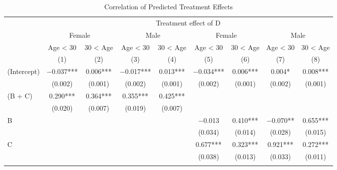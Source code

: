 \documentclass[
  11pt,
  a4paper
]{article}
\begin{document}
\begin{table}

\caption{\label{tab:rcf-int-corr}Correlation of Predicted Treatment Effects}
\centering
\fontsize{9}{11}\selectfont
\begin{threeparttable}
\begin{tabular}[t]{lcccccccc}
\toprule
\multicolumn{1}{c}{ } & \multicolumn{8}{c}{Treatment effect of D} \\
\cmidrule(l{3pt}r{3pt}){2-9}
\multicolumn{1}{c}{ } & \multicolumn{2}{c}{Female} & \multicolumn{2}{c}{Male} & \multicolumn{2}{c}{Female} & \multicolumn{2}{c}{Male} \\
\cmidrule(l{3pt}r{3pt}){2-3} \cmidrule(l{3pt}r{3pt}){4-5} \cmidrule(l{3pt}r{3pt}){6-7} \cmidrule(l{3pt}r{3pt}){8-9}
\multicolumn{1}{c}{ } & \multicolumn{1}{c}{Age < 30} & \multicolumn{1}{c}{30 < Age} & \multicolumn{1}{c}{Age < 30} & \multicolumn{1}{c}{30 < Age} & \multicolumn{1}{c}{Age < 30} & \multicolumn{1}{c}{30 < Age} & \multicolumn{1}{c}{Age < 30} & \multicolumn{1}{c}{30 < Age} \\
\cmidrule(l{3pt}r{3pt}){2-2} \cmidrule(l{3pt}r{3pt}){3-3} \cmidrule(l{3pt}r{3pt}){4-4} \cmidrule(l{3pt}r{3pt}){5-5} \cmidrule(l{3pt}r{3pt}){6-6} \cmidrule(l{3pt}r{3pt}){7-7} \cmidrule(l{3pt}r{3pt}){8-8} \cmidrule(l{3pt}r{3pt}){9-9}
  & (1) & (2) & (3) & (4) & (5) & (6) & (7) & (8)\\
\midrule
(Intercept) & \num{-0.037}*** & \num{0.006}*** & \num{-0.017}*** & \num{0.013}*** & \num{-0.034}*** & \num{0.006}*** & \num{0.004}* & \num{0.008}***\\
 & (\num{0.002}) & (\num{0.001}) & (\num{0.002}) & (\num{0.001}) & (\num{0.002}) & (\num{0.001}) & (\num{0.002}) & (\num{0.001})\\
(B + C) & \num{0.290}*** & \num{0.364}*** & \num{0.355}*** & \num{0.425}*** &  &  &  & \\
 & (\num{0.020}) & (\num{0.007}) & (\num{0.019}) & (\num{0.007}) &  &  &  \vphantom{1} & \\
B &  &  &  &  & \num{-0.013} & \num{0.410}*** & \num{-0.070}** & \num{0.655}***\\
 &  &  &  &  & (\num{0.034}) & (\num{0.014}) & (\num{0.028}) & (\num{0.015})\\
C &  &  &  &  & \num{0.677}*** & \num{0.323}*** & \num{0.921}*** & \num{0.272}***\\
 &  &  &  &  & (\num{0.038}) & (\num{0.013}) & (\num{0.033}) & (\num{0.011})\\
\addlinespace[0.3em]
\multicolumn{9}{l}{\textit{Linear combination test (F-test)}}\\

\end{tabular}
\end{threeparttable}
\end{table}
\end{document}
